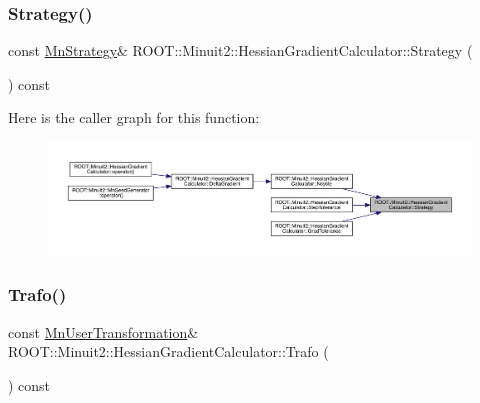 \mbox{\label{classROOT_1_1Minuit2_1_1HessianGradientCalculator_a407171e2df12fa67e92c0e5b7a97bb8d}} 
\subsubsection{\texorpdfstring{Strategy()}{Strategy()}\hspace{0.1cm}{\footnotesize\ttfamily [3/3]}}
{\footnotesize\ttfamily const \mbox{\hyperlink{classROOT_1_1Minuit2_1_1MnStrategy}{Mn\+Strategy}}\& R\+O\+O\+T\+::\+Minuit2\+::\+Hessian\+Gradient\+Calculator\+::\+Strategy (\begin{DoxyParamCaption}{ }\end{DoxyParamCaption}) const\hspace{0.3cm}{\ttfamily [inline]}}

Here is the caller graph for this function\+:
\nopagebreak
\begin{figure}[H]
\begin{center}
\leavevmode
\includegraphics[width=350pt]{dc/d17/classROOT_1_1Minuit2_1_1HessianGradientCalculator_a407171e2df12fa67e92c0e5b7a97bb8d_icgraph}
\end{center}
\end{figure}
\mbox{\label{classROOT_1_1Minuit2_1_1HessianGradientCalculator_a4b122eecb0217cab813601572ccbac74}} 
\subsubsection{\texorpdfstring{Trafo()}{Trafo()}\hspace{0.1cm}{\footnotesize\ttfamily [1/3]}}
{\footnotesize\ttfamily const \mbox{\hyperlink{classROOT_1_1Minuit2_1_1MnUserTransformation}{Mn\+User\+Transformation}}\& R\+O\+O\+T\+::\+Minuit2\+::\+Hessian\+Gradient\+Calculator\+::\+Trafo (\begin{DoxyParamCaption}{ }\end{DoxyParamCaption}) const\hspace{0.3cm}{\ttfamily [inline]}}

